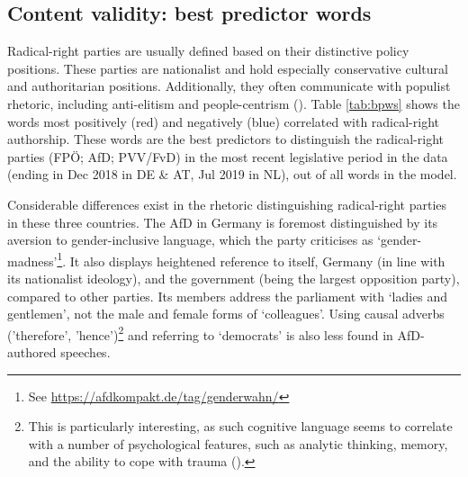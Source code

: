 \documentclass{article}
\begin{document}
\subsection{Content validity: best predictor words}

Radical-right parties are usually defined based on their distinctive policy positions. These parties are nationalist and hold especially conservative cultural and authoritarian positions. Additionally, they often communicate with populist rhetoric, including anti-elitism and people-centrism (\cite{Mudde2007}). Table \ref{tab:bpws} shows the words most positively (red) and negatively (blue) correlated with radical-right authorship. These words are the best predictors to distinguish the radical-right parties (FPÖ; AfD; PVV/FvD) in the most recent legislative period in the data (ending in Dec 2018 in DE \& AT, Jul 2019 in NL), out of all words in the model. \par

Considerable differences exist in the rhetoric distinguishing radical-right parties in these three countries. The AfD in Germany is foremost distinguished by its aversion to gender-inclusive language, which the party criticises as ‘gender-madness’\footnote{See \url{https://afdkompakt.de/tag/genderwahn/}}. It also displays heightened reference to itself, Germany (in line with its nationalist ideology), and the government (being the largest opposition party), compared to other parties. Its members address the parliament with ‘ladies and gentlemen’, not the male and female forms of ‘colleagues’. Using causal adverbs ('therefore', 'hence')\footnote{This is particularly interesting, as such cognitive language seems to correlate with a number of psychological features, such as analytic thinking, memory, and the ability to cope with trauma  (\cite{Pennebaker2003, Pennebaker2011}).} and referring to ‘democrats’ is also less found in AfD-authored speeches. \par
\end{document}
